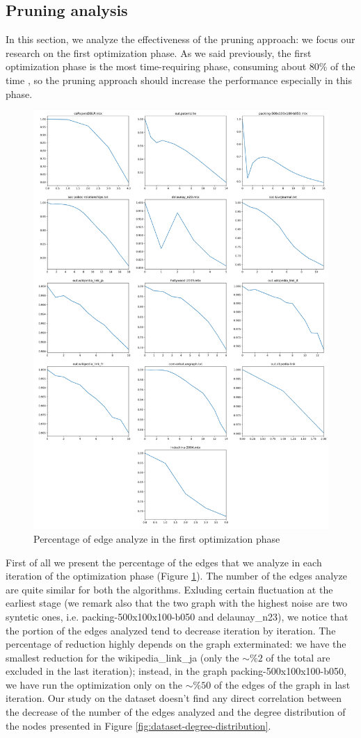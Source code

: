\subsection{Pruning analysis}
In this section, we analyze the effectiveness of the pruning approach: we focus our research on the first optimization phase. As we said previously, the first optimization phase is the most time-requiring phase, consuming about 80\% of the time \cite{wickramaarachchi2014fast}, so the pruning approach should increase the performance especially in this phase.
\begin{figure}[h]
	\centering
	\includegraphics[width=0.7\linewidth]{0-resources/edge-percentage}
	\caption{Percentage of edge analyze in the first optimization phase}
	\label{fig:edge-percentage}
\end{figure}
First of all we present the percentage of the edges that we analyze in each iteration of the optimization phase (Figure \ref{fig:edge-percentage}). The number of the edges analyze are quite similar for both the algorithms. Exluding certain fluctuation at the earliest stage (we remark also that the two graph with the highest noise are two syntetic ones, i.e. packing-500x100x100-b050 and delaunay\_n23), we notice that the portion of the edges analyzed tend to decrease iteration by iteration. The percentage of reduction highly depends on the graph exterminated: we have the smallest reduction for the wikipedia\_link\_ja (only the $\sim\%2$ of the total are excluded in the last iteration); instead, in the graph packing-500x100x100-b050, we have run the optimization only on the $\sim\%50$ of the edges of the graph in last iteration. Our study on the dataset doesn't find any direct correlation between the decrease of the number of the edges analyzed and the degree distribution of the nodes presented in Figure \ref{fig:dataset-degree-distribution}.
